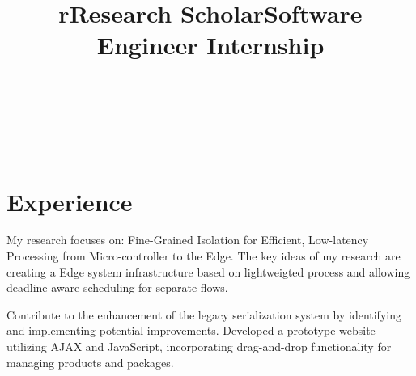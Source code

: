 \begin{format}
\title{r}\\
\\
\body\\
\end{format}
\section{Experience}
\title{Research Scholar}
\begin{position}
	\phantom{XXx}My research focuses on: Fine-Grained Isolation for Efficient, Low-latency Processing from Micro-controller to the Edge. The key ideas of my research are creating a Edge system infrastructure based on lightweigted process and allowing deadline-aware scheduling for separate flows.
\end{position}

\title{Software Engineer Internship}
\begin{position}
	\phantom{XXx}Contribute to the enhancement of the legacy serialization system by identifying and implementing potential improvements. Developed a prototype website utilizing AJAX and JavaScript, incorporating drag-and-drop functionality for managing products and packages.
\end{position}
